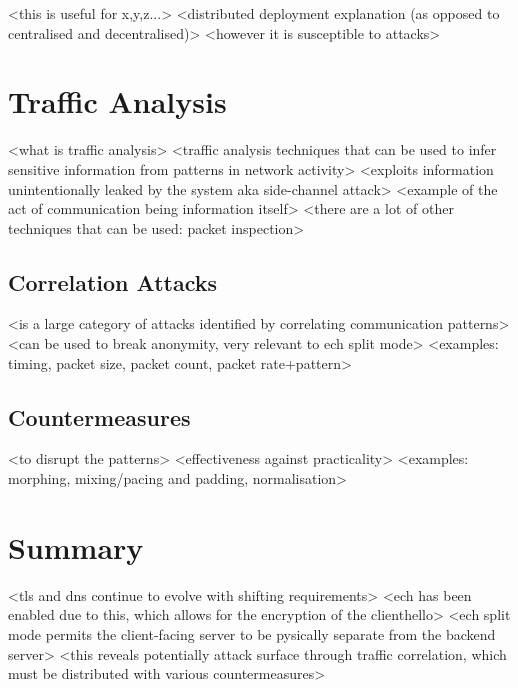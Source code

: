 <this is useful for x,y,z...>
<distributed deployment explanation (as opposed to centralised and decentralised)>
<however it is susceptible to attacks>







\section{Traffic Analysis}

<what is traffic analysis>
<traffic analysis techniques that can be used to infer sensitive information from patterns in network activity>
<exploits information unintentionally leaked by the system aka side-channel attack>
<example of the act of communication being information itself>
<there are a lot of other techniques that can be used: packet inspection>

\subsection{Correlation Attacks}

<is a large category of attacks identified by correlating communication patterns>
<can be used to break anonymity, very relevant to ech split mode>
<examples: timing, packet size, packet count, packet rate+pattern>

\subsection{Countermeasures}

<to disrupt the patterns>
<effectiveness against practicality>
<examples: morphing, mixing/pacing and padding, normalisation>








\section{Summary}

<tls and dns continue to evolve with shifting requirements>
<ech has been enabled due to this, which allows for the encryption of the clienthello>
<ech split mode permits the client-facing server to be pysically separate from the backend server>
<this reveals potentially attack surface through traffic correlation, which must be distributed with various countermeasures>
